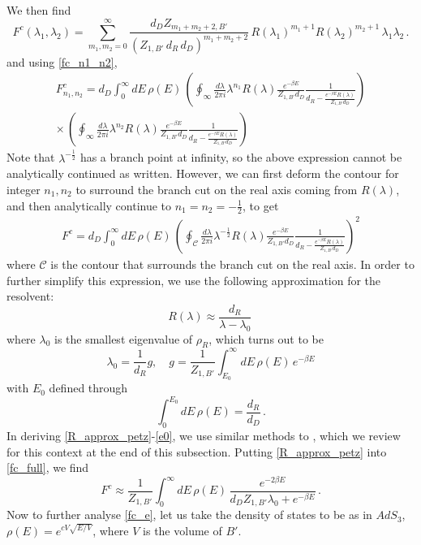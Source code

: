 \documentclass[a4paper,11pt]{article}
\newcommand\half{{\ensuremath{\frac{1}{2}}}}
\newcommand{\be}{\begin{equation}}
\newcommand{\ee}{\end{equation}}
\newcommand\ha{{\half}}
\newcommand\sC{{\ensuremath{{\mathcal C}}}}
\begin{document}
\begin{enumerate}
\begin{appendix}
 We then find 
\be 
\label{fcm12}
F^c(\lambda_1, \lambda_2) = \sum_{m_1, m_2=0}^{\infty} \frac{d_D Z_{m_1 + m_2+2, B'}}{(Z_{1,B'} \, d_R \, d_D)^{m_1 + m_2 +2}} \, R(\lambda_1)^{m_1 +1} R(\lambda_2)^{m_2 +1} \, \lambda_1 \lambda_2 \, .  
\ee
and using \eqref{fc_n1_n2}, 
\be 
\begin{gathered} 
F^c_{n_1, n_2} = d_D \int_0^{\infty} dE\, \rho(E) \, \left(\oint_{\infty} \frac{d\lambda}{2\pi i} \lambda^{n_1}R(\lambda)\frac{e^{-\beta E}}{Z_{1, B'} d_D} \frac{1}{d_R- \frac{e^{-\beta E} R(\lambda)}{Z_{1, B'} d_D}}\right) \\ \times \, \left(\oint_{\infty} \frac{d\lambda}{2\pi i} \lambda^{n_2}R(\lambda)\frac{e^{-\beta E}}{Z_{1, B'} d_D} \frac{1}{d_R- \frac{e^{-\beta E} R(\lambda)}{Z_{1, B'} d_D}}\right) 
\end{gathered} 
\label{fc_full_def}
\ee
Note that $\lambda^{-\ha}$ has a branch point at infinity, so the above expression cannot be analytically continued as written. However, we can first deform the contour for integer $n_1, n_2$ to surround the branch cut on the real axis coming from $R(\lambda)$, and then analytically continue to $n_1= n_2 =-\ha$, to get 
\be 
\begin{gathered} 
F^c = d_D \int_0^{\infty} dE\, \rho(E) \, \left(\oint_{\sC} \frac{d\lambda}{2\pi i} \lambda^{-\ha}R(\lambda)\frac{e^{-\beta E}}{Z_{1, B'} d_D} \frac{1}{d_R- \frac{e^{-\beta E} R(\lambda)}{Z_{1, B'} d_D}}\right)^2 
\end{gathered} 
\label{fc_full}
\ee
where $\sC$ is the contour that surrounds the branch cut on the real axis. In order to further simplify this expression, we use the following approximation for the resolvent: 
\be 
R(\lambda) \approx \frac{d_R}{\lambda - \lambda_0} \, \label{R_approx_petz}
\ee
where $\lambda_0$ is the smallest eigenvalue of $\rho_R$, which turns out to be 
\be 
\lambda_0 =  \frac{1}{d_R}g, \quad g = \frac{1}{Z_{1, B'}}\int_{E_0}^{\infty} dE \, \rho(E)\, e^{-\beta E} \label{lambda0}
\ee
with $E_0$ defined through 
\be 
\int_0^{E_0} dE\, \rho(E) = \frac{d_R}{d_D} \label{e0}\, . 
\ee 
In deriving \eqref{R_approx_petz}-\eqref{e0}, we use similar methods to \cite{2019arXiv191111977P}, which we review for this context at the end of this subsection. Putting \eqref{R_approx_petz} into \eqref{fc_full}, we find 
\be 
F^c \approx \frac{1}{Z_{1, B'}} \int_0^{\infty} dE\, \rho(E)\, \frac{e^{-2\beta E}}{d_D Z_{1, B'} \lambda_0 +{e^{-\beta E}}} \, . \label{fc_e}
\ee
Now to further analyse \eqref{fc_e}, let us take the density of states to be as in $AdS_3$, $\rho(E) = e^{c V\sqrt{E/V}}$, where $V$ is the volume of $B'$.  

\end{appendix}
\end{enumerate}
\end{document}
